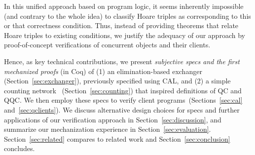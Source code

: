 In this unified approach based on program logic, it seems inherently
impossible (and contrary to the whole idea) to classify Hoare triples
as corresponding to this or that correctness condition. Thus, instead
of providing theorems that relate Hoare triples to existing
conditions, we justify the adequacy of our approach by
proof-of-concept verifications of concurrent objects and their
clients.

Hence, as key technical contributions, we present \emph{subjective
  specs and the first mechanized proofs} (in Coq) of (1) an
elimination-based exchanger~\cite{Scherer-al:SCOOL05}
(Section~\ref{sec:exchanger}), previously specified using CAL, and (2)
a simple counting network~\cite{Aspnes-al:JACM94}
(Section~\ref{sec:counting}) that inspired definitions of QC and
QQC. We then employ these specs to verify client
programs~(Sections~\ref{sec:cal} and~\ref{sec:qclients}).
%
%
We discuss alternative design choices for specs and further
applications of our verification approach in
Section~\ref{sec:discussion}, and summarize our mechanization
experience in Section~\ref{sec:evaluation}. Section~\ref{sec:related}
compares to related work and Section~\ref{sec:conclusion} concludes.

%

